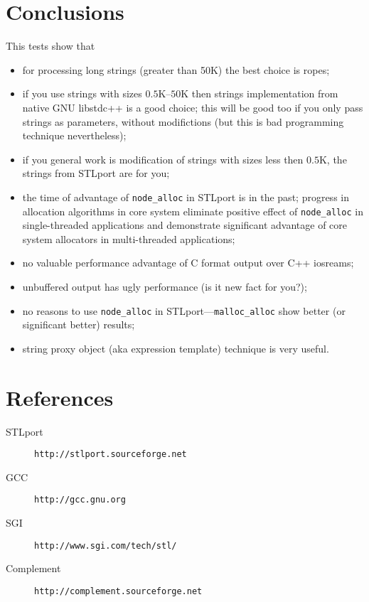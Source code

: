 \documentclass[a4paper]{article}
\providecommand{\STLport}{{\fontfamily{cmss}\selectfont STLport}}
\providecommand{\libstd}{{\fontfamily{cmtt}\selectfont GNU \mbox{libstdc++}}}
\newcommand{\CPP}{\mbox{{C}{+}{+}}}
\begin{document}
\section{Conclusions}

This tests show that
\begin{itemize}
  \item for processing long strings (greater than 50K) the best choice is
        ropes;
  \item if you use strings with sizes $0.5$K--$50$K then strings implementation
        from native \libstd{} is a good choice; this will be good too if you only pass
        strings as parameters, without modifictions (but this is bad programming
        technique nevertheless);
  \item if you general work is modification of strings with sizes less then $0.5$K,
        the strings from \STLport{} are for you;
  \item the time of advantage of \texttt{node\_alloc} in \STLport{} is in the past;
        progress in allocation algorithms in core system eliminate positive
        effect of \texttt{node\_alloc} in single-threaded applications and demonstrate
        significant advantage of core system allocators in multi-threaded
        applications;
  \item no valuable performance advantage of C format output over \CPP{} iosreams;
  \item unbuffered output has ugly performance (is it new fact for you?);
  \item no reasons to use \verb|node_alloc| in \STLport{}---\verb|malloc_alloc|
        show better (or significant better) results;
  \item string proxy object (aka expression template) technique is very useful.
\end{itemize}


\section{References}

\noindent
\begin{description}
  \item[STLport] \texttt{http://stlport.sourceforge.net}
  \item[GCC]     \texttt{http://gcc.gnu.org}
  \item[SGI]     \texttt{http://www.sgi.com/tech/stl/}
  \item[Complement] \texttt{http://complement.sourceforge.net}
\end{description}
\end{document}
